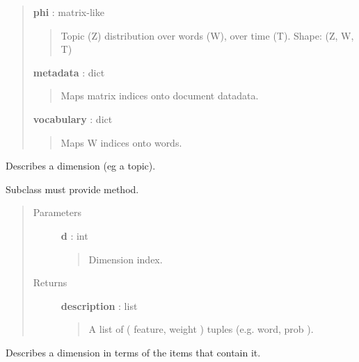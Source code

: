 \documentclass[letterpaper,10pt,english]{sphinxmanual}
\begin{document}
\begin{fulllineitems}
\begin{quote}
\begin{description}
\textbf{phi} : matrix-like
\begin{quote}

Topic (Z) distribution over words (W), over time (T). Shape: 
(Z, W, T)
\end{quote}

\textbf{metadata} : dict
\begin{quote}

Maps matrix indices onto document datadata.
\end{quote}

\textbf{vocabulary} : dict
\begin{quote}

Maps W indices onto words.
\end{quote}

\end{description}\end{quote}

\begin{fulllineitems}
\label{tethne.model.corpus.dtmmodel:tethne.model.corpus.dtmmodel.DTMModel.dimension}
Describes a dimension (eg a topic).

Subclass must provide  method.
\begin{quote}\begin{description}
\item[{Parameters}] \leavevmode
\textbf{d} : int
\begin{quote}

Dimension index.
\end{quote}

\item[{Returns}] \leavevmode
\textbf{description} : list
\begin{quote}

A list of ( feature, weight ) tuples (e.g. word, prob ).
\end{quote}

\end{description}\end{quote}

\end{fulllineitems}


\begin{fulllineitems}
\label{tethne.model.corpus.dtmmodel:tethne.model.corpus.dtmmodel.DTMModel.dimension_items}
Describes a dimension in terms of the items that contain it.


\end{fulllineitems}
\end{fulllineitems}
\end{document}
